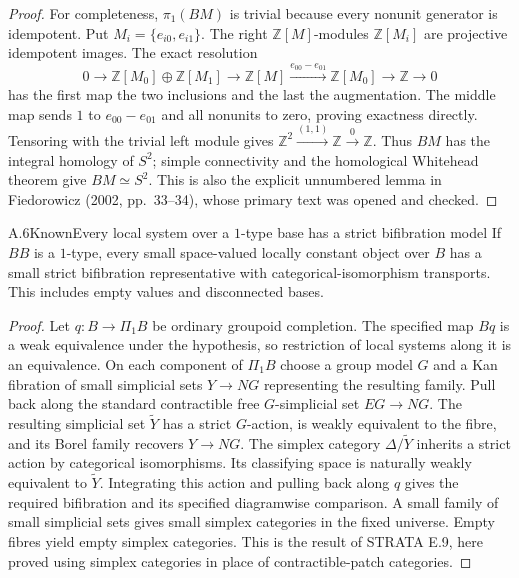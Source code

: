 \begin{proof}
For completeness, $\pi_1(BM)$ is trivial because every nonunit generator is idempotent. Put $M_i=\{e_{i0},e_{i1}\}$. The right $\mathbb Z[M]$-modules $\mathbb Z[M_i]$ are projective idempotent images. The exact resolution
\[
0\to\mathbb Z[M_0]\oplus\mathbb Z[M_1]\to\mathbb Z[M]
 \xrightarrow{e_{00}-e_{01}}\mathbb Z[M_0]\to\mathbb Z\to0
\]
has the first map the two inclusions and the last the augmentation. The middle map sends $1$ to $e_{00}-e_{01}$ and all nonunits to zero, proving exactness directly. Tensoring with the trivial left module gives $\mathbb Z^2\xrightarrow{(1,1)}\mathbb Z\xrightarrow0\mathbb Z$. Thus $BM$ has the integral homology of $S^2$; simple connectivity and the homological Whitehead theorem give $BM\simeq S^2$. This is also the explicit unnumbered lemma in Fiedorowicz (2002, pp.~33--34), whose primary text was opened and checked.
\end{proof}

\begin{result}{A.6}{Known}{Every local system over a $1$-type base has a strict bifibration model}
If $BB$ is a $1$-type, every small space-valued locally constant object over $B$ has a small strict bifibration representative with categorical-isomorphism transports. This includes empty values and disconnected bases.
\end{result}
\begin{proof}
Let $q:B\to\Pi_1B$ be ordinary groupoid completion. The specified map $Bq$ is a weak equivalence under the hypothesis, so restriction of local systems along it is an equivalence. On each component of $\Pi_1B$ choose a group model $G$ and a Kan fibration of small simplicial sets $Y\to NG$ representing the resulting family. Pull back along the standard contractible free $G$-simplicial set $EG\to NG$. The resulting simplicial set $\widetilde Y$ has a strict $G$-action, is weakly equivalent to the fibre, and its Borel family recovers $Y\to NG$. The simplex category $\Delta/\widetilde Y$ inherits a strict action by categorical isomorphisms. Its classifying space is naturally weakly equivalent to $\widetilde Y$. Integrating this action and pulling back along $q$ gives the required bifibration and its specified diagramwise comparison. A small family of small simplicial sets gives small simplex categories in the fixed universe. Empty fibres yield empty simplex categories. This is the result of STRATA E.9, here proved using simplex categories in place of contractible-patch categories.
\end{proof}

